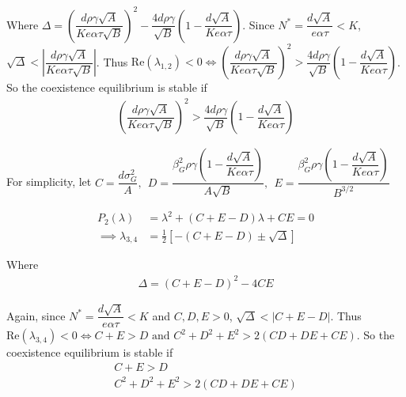 \documentclass[12pt]{article}
\begin{document}
Where $\Delta = \left({\dfrac{d\rho\gamma\sqrt{A}}{Ke\alpha\tau\sqrt{B}}}\right)^2 - \dfrac{4d\rho\gamma}{\sqrt{B}}\left(1 - \dfrac{d\sqrt{A}}{Ke\alpha\tau}\right)$.  Since $N^* = \dfrac{d\sqrt{A}}{e\alpha\tau} < K$, $\sqrt{\Delta} < \left|{\dfrac{d\rho\gamma\sqrt{A}}{Ke\alpha\tau\sqrt{B}}}\right|$.  Thus $\text{Re} (\lambda_{1,2}) < 0 \iff \left(\dfrac{d\rho\gamma\sqrt{A}}{Ke\alpha\tau\sqrt{B}}\right)^2 > \dfrac{4d\rho\gamma}{\sqrt{B}} \left({1-\dfrac{d\sqrt{A}}{Ke\alpha\tau}}\right)$.  So the coexistence equilibrium is stable if 
\begin{align*}
	\left(\dfrac{d\rho\gamma\sqrt{A}}{Ke\alpha\tau\sqrt{B}}\right)^2 > \dfrac{4d\rho\gamma}{\sqrt{B}} \left({1-\dfrac{d\sqrt{A}}{Ke\alpha\tau}}\right)
\end{align*}

For simplicity, let $ C = \dfrac{d\sigma_G^2}{A}, \  \ D = \dfrac{\beta_G^2\rho\gamma\left({1-\dfrac{d\sqrt{A}}{Ke\alpha\tau}}\right)}{A\sqrt{B}}, \  \ E = \dfrac{\beta_G^2\rho\gamma\left({1-\dfrac{d\sqrt{A}}{Ke\alpha\tau}}\right)}{B^{3/2}} $

\begin{align*}
	P_2(\lambda) &= \lambda^2 + (C+E-D)\lambda + CE = 0 \\
	\implies \lambda_{3,4} &= \frac{1}{2}\left[{-(C+E-D) \pm \sqrt{\Delta}}\right]
\end{align*}

Where
\begin{align*}
	\Delta = (C+E-D)^2 - 4CE
\end{align*} 

Again, since $N^*=\dfrac{d\sqrt{A}}{e\alpha\tau} < K$ and $C,D,E > 0 $, $\sqrt{\Delta} < \left|{C+E-D}\right|$. Thus $\text{Re} (\lambda_{3,4}) < 0 \iff C+E>D \text{ and } C^2 + D^2 + E^2 > 2(CD + DE + CE)$.  So the coexistence equilibrium is stable if 
\begin{align*}
	C+E>D \\
	C^2 + D^2 + E^2 > 2(CD + DE + CE)
\end{align*}
\end{document}
